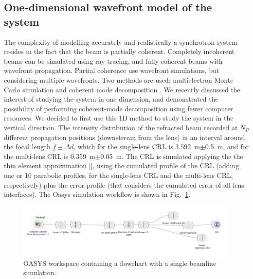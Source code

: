 \documentclass[preprint]{iucr}
\newcommand{\todo}[1]{{\color{red}[TODO: "#1'']}}
\begin{document}
\subsection{One-dimensional wavefront model of the system}\label{sec:descriptionsystem}
The complexity of modelling accurately and realistically a synchrotron system resides in the fact that the beam is partially coherent. Completely incoherent beams can be simulated using ray tracing, and fully coherent beams with wavefront propagation. Partial coherence use wavefront simulations, but considering multiple wavefronts. Two methods are used: multielectron Monte Carlo simulation \cite{codeSRW_ME} and coherent mode decomposition \cite{Glass2017}. We recently discussed the interest of studying the system in one dimension, and demonstrated the possibility of performing coherent-mode decomposition \cite{multioptics}  using fewer computer resources. We decided to first use this 1D method to study the system in the vertical direction. 
The intensity distribution of the refracted beam recorded at $N_P$ different propagation positions (downstream from the lens) in an interval around the focal length $f\pm\Delta d$, which for the single-lens CRL is \SI{3.592}{\meter}$\pm$\SI{0.5}{\meter}, and for the multi-lens CRL is \SI{0.359}{\meter}$\pm$\SI{0.05}{\meter}.
The CRL is simulated applying the the thin element approximation [\cite{Celestre2020, multioptics}], using the cumulated profile of the CRL (adding one or 10 parabolic profiles, for the single-lens CRL and the multi-lens CRL, respectively) plus the error profile (that considers the cumulated error of all lens interfaces).
The Oasys \cite{codeOASYS} simulation workflow is shown in Fig.~\ref{fig:oasys}. 

\begin{figure}\label{fig:oasys}
    \includegraphics[width=0.99\textwidth]{figures/oasys.png}
    \caption{OASYS workspace containing a flowchart with a single beamline simulation. 
    }
\end{figure}
\end{document}
